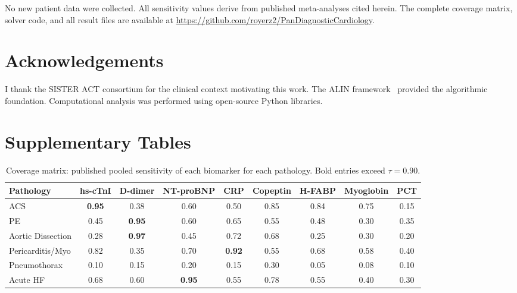 \documentclass[times, twoside, watermark]{zHenriquesLab-StyleBioRxiv}
\newenvironment{acknowledgements}{\section*{Acknowledgements}}{}
\begin{document}
No new patient data were collected. All sensitivity values derive from published meta-analyses cited herein. The complete coverage matrix, solver code, and all result files are available at \url{https://github.com/royerz2/PanDiagnosticCardiology}.

\begin{acknowledgements}
I thank the SISTER ACT consortium for the clinical context motivating this work. The ALIN framework~\cite{Erzurumluoglu2026ALIN} provided the algorithmic foundation. Computational analysis was performed using open-source Python libraries.
\end{acknowledgements}


\onecolumn

\section*{Supplementary Tables}

\begin{table}[h]
\centering
\caption{Coverage matrix: published pooled sensitivity of each biomarker for each pathology. Bold entries exceed $\tau = 0.90$.}
\label{tab:coverage_full}
\small
\begin{tabular}{@{}lcccccccc@{}}
\toprule
\textbf{Pathology} & \textbf{hs-cTnI} & \textbf{D-dimer} & \textbf{NT-proBNP} & \textbf{CRP} & \textbf{Copeptin} & \textbf{H-FABP} & \textbf{Myoglobin} & \textbf{PCT} \\
\midrule
ACS & \textbf{0.95} & 0.38 & 0.60 & 0.50 & 0.85 & 0.84 & 0.75 & 0.15 \\
PE & 0.45 & \textbf{0.95} & 0.60 & 0.65 & 0.55 & 0.48 & 0.30 & 0.35 \\
Aortic Dissection & 0.28 & \textbf{0.97} & 0.45 & 0.72 & 0.68 & 0.25 & 0.30 & 0.20 \\
Pericarditis/Myo & 0.82 & 0.35 & 0.70 & \textbf{0.92} & 0.55 & 0.68 & 0.58 & 0.40 \\
Pneumothorax & 0.10 & 0.15 & 0.20 & 0.15 & 0.30 & 0.05 & 0.08 & 0.10 \\
Acute HF & 0.68 & 0.60 & \textbf{0.95} & 0.55 & 0.78 & 0.55 & 0.40 & 0.30 \\
\bottomrule
\end{tabular}
\end{table}
\end{document}
